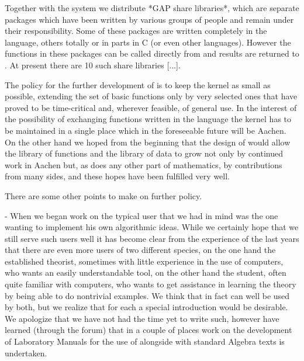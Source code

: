 Together with the  system we distribute *GAP  share libraries*, which are
separate packages which have been written by various groups of people and
remain   under their responsibility.  Some  of these packages are written
completely in the  {\GAP} language, others totally or  in parts in C  (or
even  other languages). However  the  functions in these  packages can be
called  directly from   {\GAP}  and results are   returned  to {\GAP}. At
present there are 10 such share libraries [$\ldots$].

The policy for the further development of {\GAP} is to keep the kernel as
small  as possible,  extending  the set  of basic functions  only by very
selected   ones that  have  proved  to   be  time-critical and,  wherever
feasible,  of  general use.    In  the interest  of the    possibility of
exchanging functions written in the {\GAP} language the  kernel has to be
maintained in  a  single place  which in  the foreseeable  future will be
Aachen.  On the other hand we hoped from the beginning that the design of
{\GAP} would  allow the library  of {\GAP} functions   and the library of
data to grow not only by continued work in Aachen  but, as does any other
part of mathematics, by contributions  from  many sides, and these  hopes
have been fulfilled very well.

There are some other points to make on further policy.

\beginlist
  \item{-}
    When we began work on {\GAP} the typical user that we had in mind was
    the  one wanting to  implement his own  algorithmic  ideas.  While we
    certainly  hope  that we still serve  such  users well it  has become
    clear from the experience of the last  years that there are even more
    users  of  two different species,  on the  one   hand the established
    theorist,  sometimes with little experience  in the use of computers,
    who wants   an  easily understandable tool, on   the   other hand the
    student,   often quite  familiar with  computers,   who wants to  get
    assistance  in learning the theory   by  being able to do  nontrivial
    examples.  We think that in fact {\GAP} can well be used by both, but
    we realize  that for each a  special introduction would be desirable.
    We apologize that we have not had the time yet to write such, however
    have learned (through the  {\GAP} forum) that in  a couple  of places
    work on the  development of Laboratory Manuals for  the use of {\GAP}
    alongside with standard Algebra texts is undertaken.

